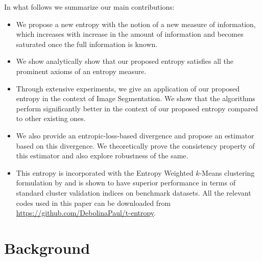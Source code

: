 \documentclass{article}
\begin{document}
In what follows we summarize our main contributions:
\begin{itemize}
    \item We propose a new entropy with the notion of a new measure of information, which increases with increase in the amount of information and becomes saturated once the full information is known.
    \item We show analytically show that our proposed entropy satisfies all the prominent axioms of an entropy measure.
    \item Through extensive experiments, we give an application of our proposed entropy in the context of Image Segmentation. We show that the algorithms perform significantly better in the context of our proposed entropy compared to other existing ones. 
    \item We also provide an entropic-loss-based divergence and propose an estimator based on this divergence. We theoretically prove the consistency property of this estimator and also explore robustness of the same.
    \item This entropy is incorporated with the Entropy Weighted $k$-Means clustering formulation by \cite{jing2007entropy} and is shown to have superior performance in terms of standard cluster validation indices on benchmark datasets. All the relevant codes used in this paper can be downloaded from \href{https://github.com/DebolinaPaul/t-entropy}{https://github.com/DebolinaPaul/t-entropy}.
\end{itemize}
\par
\section{Background}
\end{document}
